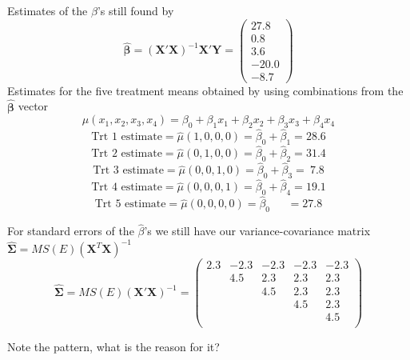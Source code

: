 \newpage

Estimates of the $\beta$'s still found by 
\[\hat{\boldsymbol{\beta}}= (\textbf{X}'\textbf{X})^{-1}\textbf{X}'\textbf{Y} = \left(\begin{array}{r} 27.8 \\ 0.8 \\ 3.6 \\
-20.0 \\ -8.7 \end{array} \right)
\]
Estimates for the five treatment means obtained by using combinations from the $\hat{\boldsymbol{\beta}}$ vector 
$$\mu(x_1,x_2,x_3,x_4)=\beta_0 + \beta_1 x_1 + \beta_2 x_2 + \beta_3 x_3 + \beta_4 x_4$$
$$\mbox{Trt 1 estimate} = \hat\mu(1,0,0,0) = \hat\beta_0 + \hat\beta_1 =  28.6 $$
$$\mbox{Trt 2 estimate} = \hat\mu(0,1,0,0) = \hat\beta_0 + \hat\beta_2 =  31.4 $$
$$\mbox{Trt 3 estimate} = \hat\mu(0,0,1,0) = \hat\beta_0 + \hat\beta_3 =  ~7.8 $$
$$\mbox{Trt 4 estimate} = \hat\mu(0,0,0,1) = \hat\beta_0 + \hat\beta_4 =  19.1 $$
$$\mbox{Trt 5 estimate} = \hat\mu(0,0,0,0) = \hat\beta_0~~~~~~~ =  27.8$$

For standard errors of the $\hat{\beta}$'s we still have our variance-covariance matrix $\hat{\boldsymbol{\Sigma}}=MS(E)(\textbf{X}^{T}\textbf{X})^{-1}$
\[ 
\hat{\boldsymbol{\Sigma}} = MS(E) (\textbf{X}'\textbf{X})^{-1} = \left(\begin{array}{rrrrr} 
2.3   & -2.3      & -2.3      & -2.3      & -2.3 \\
      & 4.5       & 2.3       & 2.3       & 2.3 \\
      &           & 4.5       & 2.3       & 2.3 \\
      &           &           & 4.5       & 2.3 \\
      &           &           &           & 4.5 \\
\end{array} \right)
\]

Note the pattern, what is the reason for it?\\~\\~\\~\\~\\~\\

